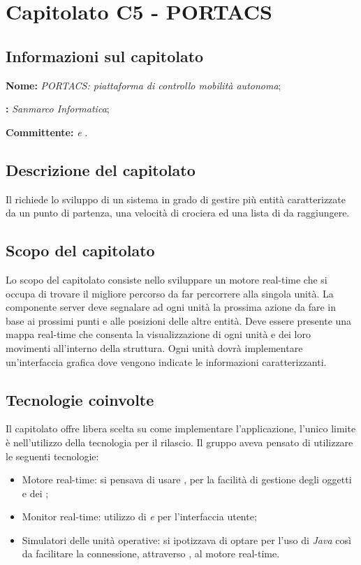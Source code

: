 \section{Capitolato C5 - PORTACS}\label{C5}
\subsection{Informazioni sul capitolato}
\begin{description}
	\item \textbf{Nome:} \textit{PORTACS: piattaforma di controllo mobilità autonoma};
	\item \textbf{:} \textit{Sanmarco Informatica};
	\item \textbf{Committente:} \textit{\VT{} e \CR{}}.
\end{description}

\subsection{Descrizione del capitolato}
Il  richiede lo sviluppo di un sistema  in grado di gestire più entità caratterizzate da un punto di partenza, una velocità di crociera ed una lista di  da raggiungere.

\subsection{Scopo del capitolato}
Lo scopo del capitolato consiste nello sviluppare un motore real-time che si occupa di trovare il migliore percorso da far percorrere alla singola unità.
La componente server deve segnalare ad ogni unità la prossima azione da fare in base ai prossimi punti e alle posizioni delle altre entità. Deve essere presente una mappa real-time che consenta la visualizzazione di ogni unità e dei loro movimenti all'interno della struttura.
Ogni unità dovrà implementare un'interfaccia grafica dove vengono indicate le informazioni caratterizzanti.

\subsection{Tecnologie coinvolte}
Il capitolato offre libera scelta su come implementare l'applicazione, l'unico limite è nell'utilizzo della tecnologia \textit{} per il rilascio. Il gruppo aveva pensato di utilizzare le seguenti tecnologie:
\begin{itemize}
	\item Motore real-time: si pensava di usare \textit{}, per la facilità di gestione degli oggetti e dei ;
	\item Monitor real-time: utilizzo di \textit{ e } per l'interfaccia utente;
	\item Simulatori delle unità operative: si ipotizzava di optare per l'uso di \textit{Java} così da facilitare la connessione, attraverso , al motore real-time.
\end{itemize}

